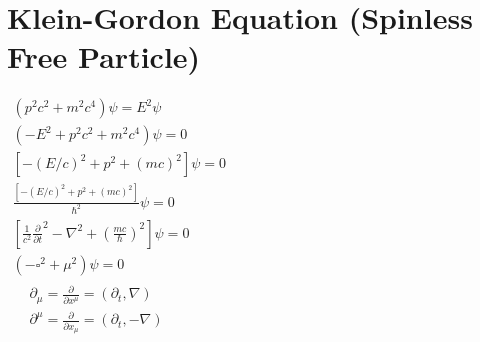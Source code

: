 \documentclass[12pt]{article}
\begin{document}
\vspace{20pt}
\section{Klein-Gordon Equation (Spinless Free Particle)}

\(\begin{gathered}
    (p^2c^2 +m^2c^4)\psi = E^2 \psi\\[5pt]
    (-E^2 + p^2c^2 + m^2c^4)\psi = 0\\[5pt]
    \left[ - (E/c)^2 + p^2 + (mc)^2 \right] \psi = 0\\[5pt]
    \frac{\left[ - (E/c)^2 + p^2 + (mc)^2 \right]}{\hbar^2} \psi = 0\\[5pt]
    \left[ \frac{1}{c^2} \frac{\partial}{\partial t}^2 - \nabla^2 
        + \left( \frac{mc}{\hbar} \right)^2 \right] \psi = 0\\[5pt]
    \boxed{ (- \square^2 + \mu^2) \psi = 0 }
        \\[10pt]
    \boxed{\begin{aligned}
            &\partial_\mu = \tfrac{\partial}{\partial x^\mu} = (\partial_t, \nabla)\\
            &\partial^\mu = \tfrac{\partial}{\partial x_\mu} = (\partial_t, -\nabla)\\
        \end{aligned}}
\end{gathered}\)
\hfill
\vline
\hfill
\end{document}
